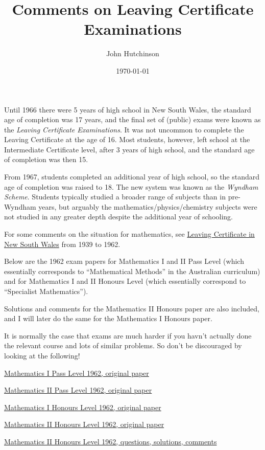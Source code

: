 \documentclass[11pt,a4paper]{article}
\author{John Hutchinson}
\date{\today}
\title{Comments on Leaving Certificate Examinations}
\theoremstyle{plain}
\theoremstyle{definition}
\begin{document}
\maketitle

Until 1966 there were 5 years of high school in New South Wales, the standard age of completion was 17 years, and the final set of (public) exams were known as the \emph{Leaving Certificate Examinations}. It was not uncommon to complete the Leaving Certificate at the age of 16.  Most students, however, left school at the Intermediate Certificate level, after 3 years of high school, and the standard age of completion was then 15.

From 1967, students completed  an additional year of high school, so the standard age of completion was raised to 18.  The new system was known as the \emph{Wyndham Scheme}.  Students typically studied a broader range of subjects than in pre-Wyndham years, but arguably the mathematics/physics/chemistry subjects  were not studied in any greater depth despite the additional year of schooling.

For some comments on the situation for mathematics, see \href{https://www2.merga.net.au/documents/RP162006.pdf}{Leaving Certificate in New South Wales} from 1939 to 1962.

\medskip
Below are the 1962 exam papers for Mathematics I and II Pass Level (which essentially corresponds to ``Mathematical Methods'' in the Australian curriculum) and for Mathematics I and II Honours Level (which essentially correspond to  ``Specialist Mathematics'').

Solutions and comments for the Mathematics II Honours  paper are also included, and I will later do the same for the   Mathematics I Honours paper.

\medskip
It is normally the case that exams are much harder if you havn't actually done the relevant course and lots of similar problems.  So don't be discouraged by looking at the following! 

\medskip


\href{https://maths-people.anu.edu.au/~john/Assets/LC\%20Maths\%20I\%20Pass\%20Exam.pdf}{Mathematics I Pass Level 1962, original paper}

\href{https://maths-people.anu.edu.au/~john/Assets/LC\%20Maths\%20II\%20Pass\%20Exam.pdf}{Mathematics II Pass Level 1962, original paper}

\href{https://maths-people.anu.edu.au/~john/Assets/LC\%20Maths\%20I\%20Honours\%20Exam.pdf}{Mathematics I Honours Level 1962, original paper}

\href{https://maths-people.anu.edu.au/~john/Assets/LC\%20Maths\%20II\%20Honours\%20Exam.pdf}{Mathematics II Honours Level 1962, original paper}

\medskip
\href{https://maths-people.anu.edu.au/~john/Assets/LC_Maths_II_Solns.pdf}{Mathematics II Honours Level 1962, questions, solutions, comments}

 








 
\end{document}
